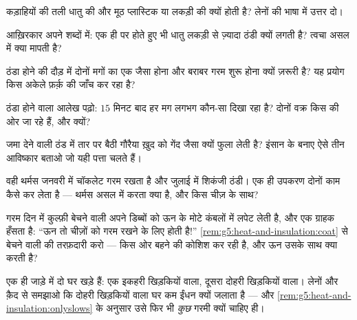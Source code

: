 \begin{exercise}[$\star$]\label{exo:g5:heat-and-insulation:4}
कड़ाहियों की तली धातु की और मूठ प्लास्टिक या लकड़ी की क्यों होती है?
लेनों की भाषा में उत्तर दो।
\end{exercise}

\begin{exercise}[$\star$]\label{exo:g5:heat-and-insulation:5}
आख़िरकार अपने शब्दों में: एक ही  पर होते हुए भी धातु लकड़ी से
ज़्यादा ठंडी क्यों लगती है? त्वचा असल में क्या मापती है?
\end{exercise}

\begin{exercise}[$\star$]\label{exo:g5:heat-and-insulation:6}
ठंडा होने की दौड़ में दोनों मगों का एक जैसा होना और बराबर गरम शुरू
होना क्यों ज़रूरी है? यह प्रयोग किस अकेले फ़र्क़ की जाँच कर रहा है?
\end{exercise}

\begin{exercise}[$\star$]\label{exo:g5:heat-and-insulation:7}
ठंडा होने वाला आलेख पढ़ो: $15$ मिनट बाद हर मग लगभग कौन-सा  दिखा
रहा है? दोनों वक्र किस  की ओर जा रहे हैं, और क्यों?
\end{exercise}

\begin{exercise}[$\star$]\label{exo:g5:heat-and-insulation:8}
जमा देने वाली ठंड में तार पर बैठी गौरैया ख़ुद को गेंद जैसा क्यों फुला
लेती है? इंसान के बनाए ऐसे तीन आविष्कार बताओ जो यही पत्ता चलते हैं।
\end{exercise}

\begin{exercise}[$\star\star$]\label{exo:g5:heat-and-insulation:9}
वही थर्मस जनवरी में चॉकलेट गरम रखता है और जुलाई में शिकंजी ठंडी। एक
ही उपकरण दोनों काम कैसे कर लेता है --- थर्मस असल में करता क्या है,
और किस चीज़ के साथ?
\end{exercise}

\begin{exercise}[$\star\star$]\label{exo:g5:heat-and-insulation:10}
गरम दिन में कुल्फ़ी बेचने वाली अपने डिब्बों को ऊन के मोटे कंबलों में
लपेट लेती है, और एक ग्राहक हँसता है: ``ऊन तो चीज़ों को गरम रखने के लिए
होती है!'' \cref{rem:g5:heat-and-insulation:coat} से बेचने वाली की
तरफ़दारी करो ---  किस ओर बहने की कोशिश कर रही है, और ऊन उसके साथ
क्या करती है?
\end{exercise}

\begin{exercise}[$\star\star$]\label{exo:g5:heat-and-insulation:11}
एक ही जाड़े में दो घर खड़े हैं: एक इकहरी खिड़कियों वाला, दूसरा दोहरी
खिड़कियों वाला। लेनों और क़ैद  से समझाओ कि दोहरी खिड़कियों वाला घर
कम ईंधन क्यों जलाता है --- और
\cref{rem:g5:heat-and-insulation:onlyslows} के अनुसार उसे फिर भी
\emph{कुछ} गरमी क्यों चाहिए ही।
\end{exercise}
